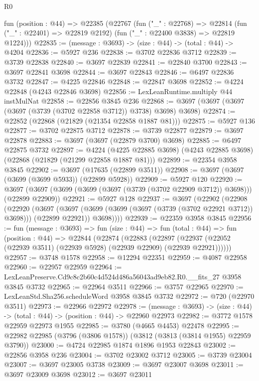 \begin{lexlean}{R0}
\begin{coremodule}
  fun (position : @44) =>
  @22385
    (@22767
      (fun ("_" : @22768) =>
      @22814 (fun ("_" : @22401) => @22819 @2192) (fun ("_" : @22400 @3838) => @22819 @1224)))
@22835 := (message : @3693) -> (size : @44) -> (total : @44) -> @4204
@22836 := @5927 @236
@22838 := @3702 @22836 @3712
@22839 := @3739 @22838
@22840 := @3697 @22839
@22841 := @22840 @3700
@22843 := @3697 @22841 @3698
@22844 := @3697 @22843
@22846 := @6497 @22836 @3732
@22847 := @4225 @22846
@22848 := @22847 @3698
@22852 := @4224 @22848 (@4243 @22846 @3698)
@22856 := LexLeanRuntime.multiply @44 instMulNat
@22858 := @22856 @3845 @236
@22868 := @3697 (@3697 (@3697 (@3697 (@3739 (@3702 @22858 @3712)) @3738) @3698) @3698)
@22874 := @22852 (@22868 (@21829 (@21354 @22858 @1887 @81)))
@22875 := @5927 @136
@22877 := @3702 @22875 @3712
@22878 := @3739 @22877
@22879 := @3697 @22878
@22883 := @3697 (@3697 (@22879 @3700) @3698)
@22885 := @6497 @22875 @3732
@22897 := @4224
    (@4225 @22885 @3698)
    (@4243 @22885 @3698)
    (@22868 (@21829 (@21299 @22858 @1887 @81)))
@22899 := @22354 @3958 @3845
@22902 := @3697 (@17635 (@22899 @3511))
@22908 := @3697 (@3697 (@3699 (@3699 @5933)) (@22899 @5928))
@22909 := @5927 @120
@22920 := @3697 (@3697 (@3699 (@3699 (@3697 (@3739 (@3702 @22909 @3712)) @3698))) (@22899 @22909))
@22921 := @5927 @128
@22937 := @3697
    (@22902
      (@22908
        (@22920
          (@3697
            (@3697 (@3699 (@3699 (@3697 (@3739 (@3702 @22921 @3712)) @3698))) (@22899 @22921))
            @3698))))
@22939 := @22359 @3958 @3845
@22956 := fun (message : @3693) =>
  fun (size : @44) =>
  fun (total : @44) =>
  fun (position : @44) =>
  @22844
    (@22874
      (@22883
        (@22897 (@22937 (@22052 (@22939 @3511) (@22939 @5928) (@22939 @22909) (@22939 @22921))))))
@22957 := @3748 @1578
@22958 := @12294 @22351
@22959 := @4087 @22958
@22960 := @22957 @22959
@22964 := LexLeanPreserve.Cd9c8c2b60c4d524d486a56043ad9eb82.R0.__fits_27 @3958 @3845 @3732
@22965 := @22964 @3511
@22966 := @3757 @22965
@22970 := LexLeanStd.Sha256.scheduleWord @3958 @3845 @3732
@22972 := @720 (@22970 @3511)
@22973 := @22966 @22972
@22978 := (message : @3693) -> (size : @44) -> (total : @44) -> (position : @44) -> @22960 @22973
@22982 := @3772 @1578 @22959 @22973 @1955
@22985 := @3780 (@4665 @4453) @22478
@22995 := @22982 @22985 (@3796 (@3806 @1578)) (@3812 (@3813 (@3814 @1955) @22959 @3790))
@23000 := @4724 @22985 @1874 @1896 @1953 @22843
@23002 := @22856 @3958 @236
@23004 := @3702 @23002 @3712
@23005 := @3739 @23004
@23007 := @3697 @23005 @3738
@23009 := @3697 @23007 @3698
@23011 := @3697 @23009 @3698
@23012 := @3697 @23011

\end{coremodule}
\end{lexlean}
